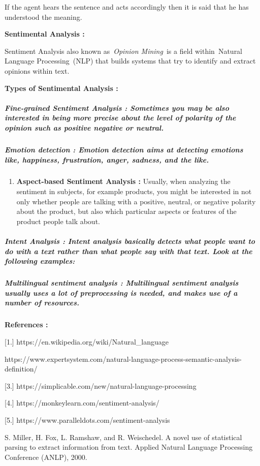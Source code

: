 \documentclass{article} %
\begin{document}
\noindent If the agent hears the sentence and acts accordingly then it is said that he has understood the meaning.

\noindent \textbf{Sentimental Analysis : }

Sentiment Analysis also known as~\textit{Opinion Mining}~is a field within~Natural Language Processing~(NLP) that builds systems that try to identify and extract opinions within text. 

\noindent \textbf{Types of Sentimental Analysis :} 


\subparagraph{ Fine-grained Sentiment Analysis : Sometimes you may be also interested in being more precise about the level of polarity of the opinion such as positive negative or neutral. }


\subparagraph{ Emotion detection : Emotion detection aims at detecting emotions like, happiness, frustration, anger, sadness, and the like. }

\begin{enumerate}
\item  \textbf{Aspect-based Sentiment Analysis : }Usually, when analyzing the sentiment in subjects, for example products, you might be interested in not only whether people are talking with a positive, neutral, or negative polarity about the product, but also which particular aspects or features of the product people talk about. 
\end{enumerate}


\subparagraph{ Intent Analysis : Intent analysis basically detects what people want to do with a text rather than what people say with that text. Look at the following examples:}


\subparagraph{ Multilingual sentiment analysis : Multilingual sentiment analysis usually uses a lot of preprocessing is needed, and makes use of a number of resources. }

\noindent \textbf{\eject }

\noindent \textbf{References :}

[1.] https://en.wikipedia.org/wiki/Natural\_language

\noindent [2.]https://www.expertsystem.com/natural-language-process-semantic-analysis-definition/

[3.] https://simplicable.com/new/natural-language-processing

[4.] https://monkeylearn.com/sentiment-analysis/

[5.] https://www.paralleldots.com/sentiment-analysis

\noindent [6. ] S. Miller, H. Fox, L. Ramshaw, and R. Weischedel. A novel use of statistical parsing to extract information from text. Applied Natural Language Processing Conference (ANLP), 2000. 
\end{document}
